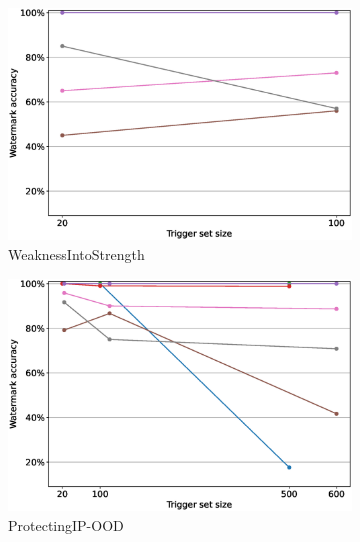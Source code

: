 \begin{figure}
    \centering
    \begin{subfigure}{0.4\linewidth}
        \includegraphics[width=\linewidth]{images/pruning/per_method/WeaknessIntoStrength_pruning_per_method_maximal_pr_rate.eps}
        \caption{WeaknessIntoStrength}
        \label{fig:pruning-max-pr-rate-weakness}
    \end{subfigure}
    \quad
    \begin{subfigure}{0.4\linewidth}
        \includegraphics[width=\linewidth]{images/pruning/per_method/ProtectingIP-OOD_pruning_per_method_maximal_pr_rate.eps}
        \caption{ProtectingIP-OOD}
        \label{fig:pruning-max-pr-rate-ood}
    \end{subfigure}
    \quad
    \begin{subfigure}{0.4\linewidth}

\end{subfigure}
\end{figure}
